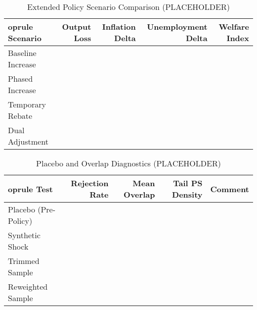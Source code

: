 \begin{table}[H]
  \centering
  \caption{Extended Policy Scenario Comparison (PLACEHOLDER)}\label{tab:policy_extended}
  \begin{tabular}{lrrrr}
    	oprule
    Scenario & Output Loss & Inflation Delta & Unemployment Delta & Welfare Index \\
    \midrule
  Baseline Increase & \textemdash{} & \textemdash{} & \textemdash{} & \textemdash{} \\
  Phased Increase & \textemdash{} & \textemdash{} & \textemdash{} & \textemdash{} \\
  Temporary Rebate & \textemdash{} & \textemdash{} & \textemdash{} & \textemdash{} \\
  Dual Adjustment & \textemdash{} & \textemdash{} & \textemdash{} & \textemdash{} \\
    \bottomrule
  \end{tabular}
\end{table}

\begin{table}[H]
  \centering
  \caption{Placebo and Overlap Diagnostics (PLACEHOLDER)}\label{tab:placebo_overlap}
  \begin{tabular}{lrrrr}
    	oprule
    Test & Rejection Rate & Mean Overlap & Tail PS Density & Comment \\
    \midrule
  Placebo (Pre-Policy) & \textemdash{} & \textemdash{} & \textemdash{} & \textemdash{} \\
  Synthetic Shock & \textemdash{} & \textemdash{} & \textemdash{} & \textemdash{} \\
  Trimmed Sample & \textemdash{} & \textemdash{} & \textemdash{} & \textemdash{} \\
  Reweighted Sample & \textemdash{} & \textemdash{} & \textemdash{} & \textemdash{} \\
    \bottomrule
  \end{tabular}
\end{table}
